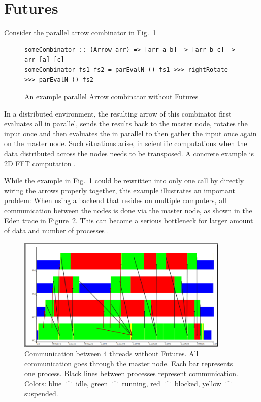 \section{Futures} \label{futures}
Consider the parallel arrow combinator in Fig.~\ref{fig:someCombinator}
\begin{figure}[h]
\begin{lstlisting}[frame=htrbl]
someCombinator :: (Arrow arr) => [arr a b] -> [arr b c] -> arr [a] [c]
someCombinator fs1 fs2 = parEvalN () fs1 >>> rightRotate >>> parEvalN () fs2
\end{lstlisting}
\caption{An example parallel Arrow combinator without Futures}
\label{fig:someCombinator}
\end{figure}
In a distributed environment, the resulting arrow of this combinator first evaluates all \code{[arr a b]} in parallel, sends the results back to the master node, rotates the input once and then evaluates the \code{[arr b c]} in parallel to then gather the input once again on the master node. 
Such situations arise, \eg in scientific computations when the data distributed across the nodes needs to be transposed. A concrete example is 2D FFT computation \cite{Gorlatch,Berthold2009-fft}.

While the example in Fig.~\ref{fig:someCombinator} could be rewritten into only one  call by directly wiring the arrows properly together, this example illustrates an important problem: When using a  backend that resides on multiple computers, all communication between the nodes is done via the master node, as shown in the Eden trace in Figure~\ref{fig:withoutFutures}. This can become a serious bottleneck %
for larger amount of data and number of processes \citep[showcases][as, \eg]{Berthold2009-fft}.
\begin{figure}[ht]
	\centering
	\includegraphics[width=0.9\textwidth]{images/withoutFutures}
	\caption[without Futures]{Communication between 4 threads without Futures. All communication goes through the master node. Each bar represents one process. Black lines between processes represent communication. Colors: blue $\hat{=}$ idle, green $\hat{=}$ running, red  $\hat{=}$ blocked, yellow $\hat{=}$ suspended.}
	\label{fig:withoutFutures}
\end{figure}

